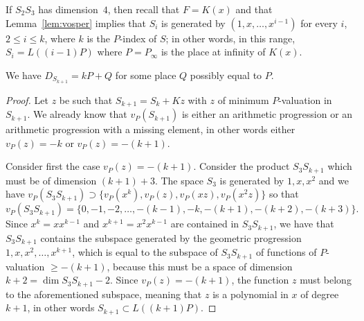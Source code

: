 \documentclass[ALCO,Unicode,ThmDefs]{cedram}
\renewcommand{\geq}{\geqslant}
\renewcommand{\leq}{\leqslant}
\begin{document}
If $S_2 S_3$ has dimension~$4$, then recall that $F=K(x)$ and that Lemma~\ref{lem:vosper} implies that $S_i$ is generated by $(1,x,\dots,x^{i-1})$ for every $i$, $2\leq i\leq k$, where $k$ is the $P$-index of $S$; in other words, in this range, $S_i=L((i-1)P)$ where $P=P_{\infty}$ is the place at infinity of $K(x)$.

\begin{lemm}\label{lem:kP+Q}
We have $D_{S_{k+1}}= kP+Q$ for some place $Q$ possibly equal to $P$.
\end{lemm}

\begin{proof}
Let $z$ be such that $S_{k+1}=S_k+Kz$ with $z$ of minimum $P$-valuation in $S_{k+1}$. We already know that $v_P(S_{k+1})$ is either an arithmetic progression or an arithmetic progression with a missing element, in other words either $v_P(z)=-k$ or $v_P(z)=-(k+1)$.

Consider first the case $v_P(z)=-(k+1)$. Consider the product $S_3S_{k+1}$ which must be of dimension $(k+1)+3$. The space $S_3$ is generated by $1,x,x^2$ and we have $v_P(S_3S_{k+1})\supset\{v_P(x^k), v_P(z), v_P(xz),v_P(x^2z)\}$ so that
\[
v_P(S_3S_{k+1})=\{0,-1,-2,\ldots,-(k-1),-k,-(k+1),-(k+2),-(k+3)\}.
\]
Since $x^k=xx^{k-1}$ and $x^{k+1}=x^2x^{k-1}$ are contained in $S_3S_{k+1}$, we have that $S_3S_{k+1}$ contains the subspace generated by the geometric progression $1,x,x^2,\ldots,x^{k+1}$, which is equal to the subspace of $S_3S_{k+1}$ of functions of $P$-valuation $\geq-(k+1)$, because this must be a space of dimension $k+2=\dim S_3S_{k+1}-2$. Since $v_P(z)=-(k+1)$, the function $z$ must belong to the aforementioned subspace, meaning that $z$ is a polynomial in $x$ of degree $k+1$, in other words $S_{k+1}\subset L((k+1)P)$.


\end{proof}
\end{document}
